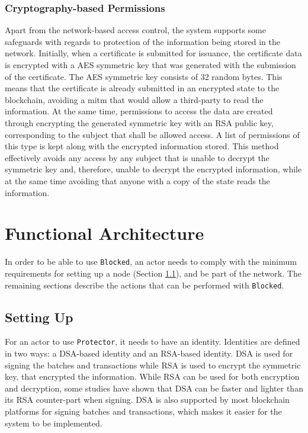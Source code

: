 \subsubsection{Cryptography-based Permissions}

Apart from the network-based access control, the system supports some safeguards with regards to protection of the information being stored in the network. Initially, when a certificate is submitted for issuance, the certificate data is encrypted with a AES symmetric key that was generated with the submission of the certificate. The AES symmetric key consists of 32 random bytes. This means that the certificate is already submitted in an encrypted state to the blockchain, avoiding a \gls{mitm} that would allow a third-party to read the information. At the same time, permissions to access the data are created through encrypting the generated symmetric key with an RSA public key, corresponding to the subject that shall be allowed access. A list of permissions of this type is kept along with the encrypted information stored. This method effectively avoids any access by any subject that is unable to decrypt the symmetric key and, therefore, unable to decrypt the encrypted information, while at the same time avoiding that anyone with a copy of the state reads the information.

\section{Functional Architecture}
\label{sec:design-interaction}

In order to be able to use \texttt{Blocked}, an actor needs to comply with the minimum requirements for setting up a node (Section \ref{sec:design-setup}), and be part of the network. The remaining sections describe the actions that can be performed with \texttt{Blocked}.

\subsection{Setting Up}
\label{sec:design-setup}

For an actor to use \texttt{Protector}, it needs to have an identity. Identities are defined in two ways: a DSA-based identity and an RSA-based identity. DSA is used for signing the batches and transactions while RSA is used to encrypt the symmetric key, that encrypted the information. While RSA can be used for both encryption and decryption, some studies have shown that DSA can be faster and lighter than its RSA counter-part when signing. DSA is also supported by most blockchain platforms for signing batches and transactions, which makes it easier for the system to be implemented.

